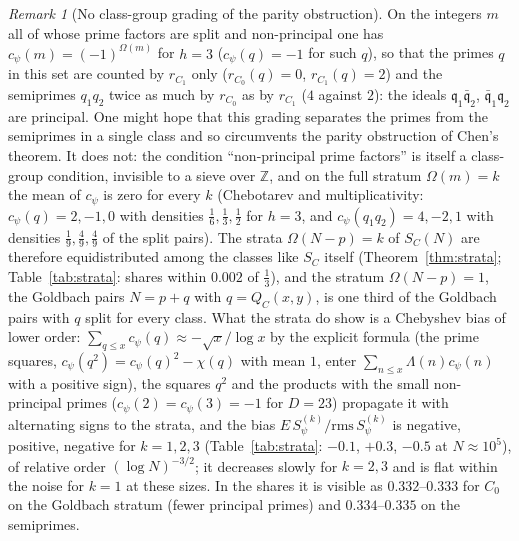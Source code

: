 ﻿\documentclass[11pt]{amsart}
\theoremstyle{remark}
\newtheorem{remark}[theorem]{Remark}
\newcommand{\Z}{\mathbb Z}
\begin{document}
\begin{remark}[No class-group grading of the parity obstruction]\label{rem:parity}
On the integers $m$ all of whose prime factors are split and non-principal one has $c_\psi(m)=(-1)^{\Omega(m)}$ for $h=3$ ($c_\psi(q)=-1$ for such $q$), so that the primes $q$ in this set are counted by $r_{C_1}$ only ($r_{C_0}(q)=0$, $r_{C_1}(q)=2$) and the semiprimes $q_1q_2$ twice as much by $r_{C_0}$ as by $r_{C_1}$ ($4$ against $2$): the ideals $\mathfrak q_1\bar{\mathfrak q}_2$, $\bar{\mathfrak q}_1\mathfrak q_2$ are principal. One might hope that this grading separates the primes from the semiprimes in a single class and so circumvents the parity obstruction of Chen's theorem. It does not: the condition ``non-principal prime factors'' is itself a class-group condition, invisible to a sieve over $\Z$, and on the full stratum $\Omega(m)=k$ the mean of $c_\psi$ is zero for every $k$ (Chebotarev and multiplicativity: $c_\psi(q)=2,-1,0$ with densities $\frac16,\frac13,\frac12$ for $h=3$, and $c_\psi(q_1q_2)=4,-2,1$ with densities $\frac19,\frac49,\frac49$ of the split pairs). The strata $\Omega(N-p)=k$ of $S_{C}(N)$ are therefore equidistributed among the classes like $S_C$ itself (Theorem~\ref{thm:strata}; Table~\ref{tab:strata}: shares within $0.002$ of $\frac13$), and the stratum $\Omega(N-p)=1$, the Goldbach pairs $N=p+q$ with $q=Q_C(x,y)$, is one third of the Goldbach pairs with $q$ split for every class. What the strata do show is a Chebyshev bias of lower order: $\sum_{q\le x}c_\psi(q)\approx-\sqrt x/\log x$ by the explicit formula (the prime squares, $c_\psi(q^2)=c_\psi(q)^2-\chi(q)$ with mean $1$, enter $\sum_{n\le x}\Lambda(n)c_\psi(n)$ with a positive sign), the squares $q^2$ and the products with the small non-principal primes ($c_\psi(2)=c_\psi(3)=-1$ for $D=23$) propagate it with alternating signs to the strata, and the bias $E\,S^{(k)}_\psi/\mathrm{rms}\,S^{(k)}_\psi$ is negative, positive, negative for $k=1,2,3$ (Table~\ref{tab:strata}: $-0.1$, $+0.3$, $-0.5$ at $N\approx10^5$), of relative order $(\log N)^{-3/2}$; it decreases slowly for $k=2,3$ and is flat within the noise for $k=1$ at these sizes. In the shares it is visible as $0.332$--$0.333$ for $C_0$ on the Goldbach stratum (fewer principal primes) and $0.334$--$0.335$ on the semiprimes.
\end{remark}
\end{document}
